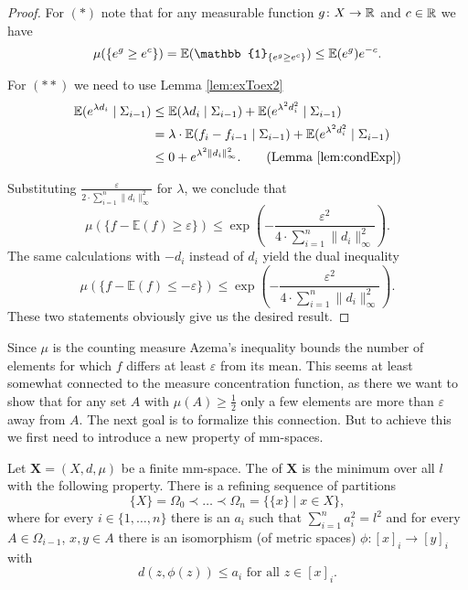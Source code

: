 \begin{proof}
	For $(\ast)$ note that for any measurable function $g\colon X\to\mathbb{R}$ and $c\in\mathbb{R}$ we have %
	\[\mu(\{e^g\geq e^c\})=\E(\mathbb{1}_{\{e^g\geq e^c\}})\leq\E(e^g)e^{-c}.\]
				
	For $(\ast\ast)$ we need to use Lemma \ref{lem:exToex2}
	\begin{align*}
		\E(e^{\lambda d_i}\mid \Sigma_{i-1}) & \leq \E(\lambda d_i\mid\Sigma_{i-1})+\E(e^{\lambda^2 d^2_i}\mid\Sigma_{i-1})            \\
		                                     & =\lambda\cdot\E( f_i-f_{i-1}\mid\Sigma_{i-1}) + \E(e^{\lambda^2 d^2_i}\mid\Sigma_{i-1}) \\
		                                     & \leq 0 + e^{\lambda^2 \|d_i\|_\infty^2}.\tag{Lemma \ref{lem:condExp}}                   
	\end{align*}
				
	Substituting $\frac{\varepsilon}{2\cdot\sum_{i=1}^{n}\|d_i\|_\infty^2}$ for $\lambda$, we conclude that
	\[\mu(\{f-\mathbb{E}(f)\geq \varepsilon\})\leq\exp\left(-\frac{\varepsilon^2}{4\cdot\sum_{i=1}^{n}\|d_i\|^2_\infty}\right). \]
	The same calculations with $-d_i$ instead of $d_i$ yield the dual inequality
	\[\mu(\{f-\mathbb{E}(f)\leq -\varepsilon\})\leq\exp\left(-\frac{\varepsilon^2}{4\cdot\sum_{i=1}^{n}\|d_i\|^2_\infty}\right). \]
	These two statements obviously give us the desired result.
\end{proof}
		
Since $\mu$ is the counting measure Azema's inequality bounds the number of elements for which $f$ differs at least $\varepsilon$ from its mean. This seems at least somewhat connected to the measure concentration function, as there we want to show that for any set $A$ with $\mu(A)\geq\frac{1}{2}$ only a few elements are more than $\varepsilon$ away from $A$.
The next goal is to formalize this connection. %
But to achieve this we first need to introduce a new property of mm-spaces.
\begin{definition}\label{def:length}
	Let $\boldsymbol{X}=(X,d,\mu)$ be a finite mm-space. The  of $\boldsymbol X$ is the minimum over all $l$ with the following property. There is a refining sequence of partitions 
	\[\{X\}=\Omega_0\prec\dots\prec\Omega_n=\{\{x\}\mid x\in X\},\]
	where for every $i\in\{1,\dots,n\}$ there is an $a_i$ such that $\sum_{i=1}^{n}a^2_i=l^2$ and for every $A\in \Omega_{i-1}$, $x,y\in A$ there is an isomorphism (of metric spaces) $\phi\colon[x]_i\to [y]_i$ with 
	\[d(z,\phi(z))\leq a_i\text{ for all $z\in[x]_i$.}\]
\end{definition}
		
